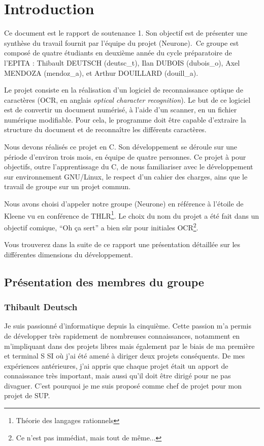 \documentclass[11pt]{report}
\begin{document}
\newpage
{}
\chapter{Introduction}

Ce document est le rapport de soutenance 1. Son objectif est de présenter une synthèse du travail fournit par l’équipe du projet (Neurone)\up{*}.\ Ce groupe est composé de quatre étudiants en deuxième année du cycle préparatoire de l’EPITA : Thibault DEUTSCH (deutsc\_t), Ilan DUBOIS (dubois\_o),  Axel MENDOZA (mendoz\_a), et Arthur DOUILLARD (douill\_a).

Le projet consiste en la réalisation d’un logiciel de reconnaissance optique de caractères (OCR, en anglais \emph{optical character recognition}). Le but de ce logiciel est de convertir un document numérisé, à l'aide d'un scanner, en un fichier numérique modifiable. Pour cela, le programme doit être capable d'extraire la structure du document et de reconnaître les différents caractères.

Nous devons réalisés ce projet en C. Son développement se déroule sur une période d’environ trois mois, en équipe de quatre personnes. Ce projet à pour objectifs, outre l'apprentissage du C, de nous familiariser avec le développement sur environnement GNU/Linux, le respect d'un cahier des charges, ains que le travail de groupe sur un projet commun.

Nous avons choisi d’appeler notre groupe (Neurone)\up{*} en référence à l’étoile de Kleene vu en conférence de THLR\footnote{Théorie des langages rationnels}. Le choix du nom du projet a été fait dans un objectif comique, ``Oh ça sert'' a bien sûr pour initiales OCR\footnote{Ce n'est pas immédiat, mais tout de même...}.

Vous trouverez dans la suite de ce rapport une présentation détaillée sur les différentes dimensions du développement.

\newpage
\section{Présentation des membres du groupe}

\subsection{Thibault Deutsch}

Je suis passionné d’informatique depuis la cinquième. Cette passion m’a permis de développer très rapidement de nombreuses connaissances, notamment en m’impliquant dans des projets libres mais également par le biais de ma première et terminal S SI où j’ai été amené à diriger deux projets conséquents. De mes expériences antérieures, j’ai appris que chaque projet était un apport de connaissance très important, mais aussi qu’il doit être dirigé pour ne pas divaguer. C’est pourquoi je me suis proposé comme chef de projet pour mon projet de SUP.
\end{document}
